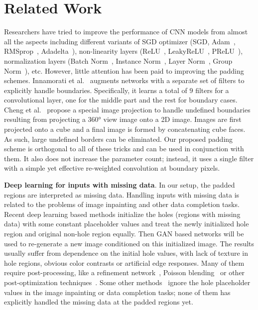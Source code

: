 \documentclass[10pt,twocolumn,letterpaper]{article}
\begin{document}
\section{Related Work}
Researchers have tried to improve the performance of CNN models from almost all the aspects including different variants of SGD optimizer (SGD, Adam~\cite{kingma2014adam}, RMSprop~\cite{tieleman2012lecture}, Adadelta~\cite{zeiler2012adadelta}), non-linearity layers (ReLU~\cite{nair2010rectified}, LeakyReLU~\cite{maas2013rectifier}, PReLU~\cite{he2015delving}), normalization layers (Batch Norm~\cite{ioffe2015batch}, Instance Norm~\cite{ulyanov1607instance}, Layer Norm~\cite{ba2016layer}, Group Norm~\cite{wu2018group}), etc. However, little attention has been paid to improving the padding schemes. Innamorati et al.~\cite{innamorati2018learning} augments networks with a separate set of filters to explicitly handle boundaries. Specifically, it learns a total of $9$ filters for a convolutional layer, one for the middle part and the rest for boundary cases. Cheng et al.~\cite{cheng2018cube} propose a special image projection to handle undefined boundaries resulting from projecting a \ang{360} view image onto a 2D image. Images are first projected onto a cube and a final image is formed by concatenating cube faces. As such, large undefined borders can be eliminated. Our proposed padding scheme is orthogonal to all of these tricks and can be used in conjunction with them. It also does not increase the parameter count; instead, it uses a single filter with a simple yet effective re-weighted convolution at boundary pixels. 

\textbf{Deep learning for inputs with missing data}. In our setup, the padded regions are interpreted as missing data. Handling inputs with missing data is related to the problems of image inpainting and other data completion tasks. Recent deep learning based methods \cite{pathak2016context,li2017generative,iizuka2017globally,yang2017high} initialize the holes (regions with missing data) with some constant placeholder values and treat the newly initialized hole region and original non-hole region equally. Then GAN based networks will be used to re-generate a new image conditioned on this initialized image. The results usually suffer from dependence on the initial hole values, with lack of texture in hole regions, obvious color contrasts or artificial edge responses. Many of them require post-processing, like a refinement network~\cite{yu2018generative,song2017image}, Poisson blending~\cite{iizuka2017globally} or other post-optimization techniques~\cite{yang2017high}. Some other methods~\cite{ulyanov2017deep,yeh2016semantic,uhrig2017sparsity} ignore the hole placeholder values in the image inpainting or data completion tasks; none of them has explicitly handled the missing data at the padded regions yet. 
\end{document}
